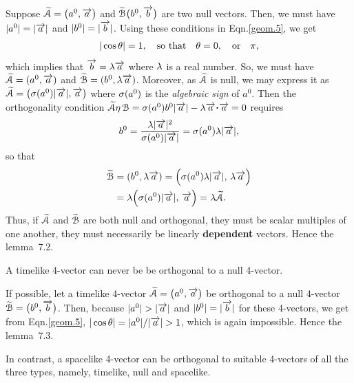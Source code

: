 \prf  Suppose $\EuScript{\tilde{A}}=\big(a^0, 
\veca{a}\big)$ and $\EuScript{\tilde{B}}\big(b^0, 
\veca{b}\big)$ are two null vectors. Then, we must have 
$|a^0| = |\veca{a}|$ and $|b^0|=|\veca{b}|$. Using 
these conditions in Eqn.\eqref{geom.5}, we get 
\begin{align}\label{geom.6} 
|\cos\gkq|=1, \quad \text{so that} \quad \gkq=0, \quad 
\text{or}\quad \pi, 
\end{align} 
which implies that  $\veca{b} = \gkl \veca{a}$ where 
$\gkl$ is a real number. So, we must have 
$\EuScript{\tilde{A}} = (a^0, \veca{a})$ and 
$\EuScript{\tilde{B}} = (b^0, \gkl \veca{a})$. 
Moreover, as $\EuScript{\tilde{A}}$ is null, we may 
express it as  $\EuScript{\tilde{A}} = 
\big(\gks(a^0)|\veca{a}|, \veca{a}\big)$ where 
$\gks(a^0)$ is the \textsl{algebraic sign} of $a^0$. 
Then the orthogonality condition  
$\EuScript{\tilde{A}}\gky\,\EuScript{B} = \gks(a^0) 
b^0|\veca{a}| - \gkl \veca{a}\dotp \veca{a}=0$ 
requires 
\begin{align*} b^0=\frac{\gkl |\veca{a}|^2}{\gks(a^0) 
|\veca{a}|} =\gks(a^0)\gkl |\veca{a}|,
\end{align*}
so that
\begin{align*}
\EuScript{\tilde{B}}&=(b^0, \gkl \veca{a})
=\Big( \gks(a^0)\gkl |\veca{a}|,\, 
\gkl\veca{a} \Big)\notag\\&
=\gkl\Big(\gks(a^0)|\veca{a}|,\, \veca{a} \Big) 
 =\gkl\EuScript{\tilde{A}}. 
\end{align*} 
Thus, if $\EuScript{\tilde{A}}$ and 
$\EuScript{\tilde{B}}$ are both 
null and orthogonal, they must be scalar multiples of 
one another, \ie they must  necessarily be linearly 
\textbf{dependent} vectors. Hence the lemma~7.2.

\Lem A timelike 4-vector can never be be orthogonal to 
a null 4-vector.

\prf  If possible, let a timelike 4-vector 
$\EuScript{\tilde{A}}=\big(a^0, \veca{a}\big)$ be 
orthogonal to a null 4-vector $\EuScript{\tilde{B}} 
=\big(b^0, \veca{b}\big)$. Then, because  $|a^0| > 
|\veca{a}|$ and $|b^0|= |\veca{b}|$ for these 
4-vectors, we get from Eqn.\eqref{geom.5}, $|\cos\gkq| 
= |a^0|/|\veca{a}|>1$, which is again impossible. 
Hence the lemma~7.3. 

\Lem In contrast, a spacelike 4-vector can be 
orthogonal to suitable 4-vectors of all the three 
types, namely, timelike, null and spacelike.

